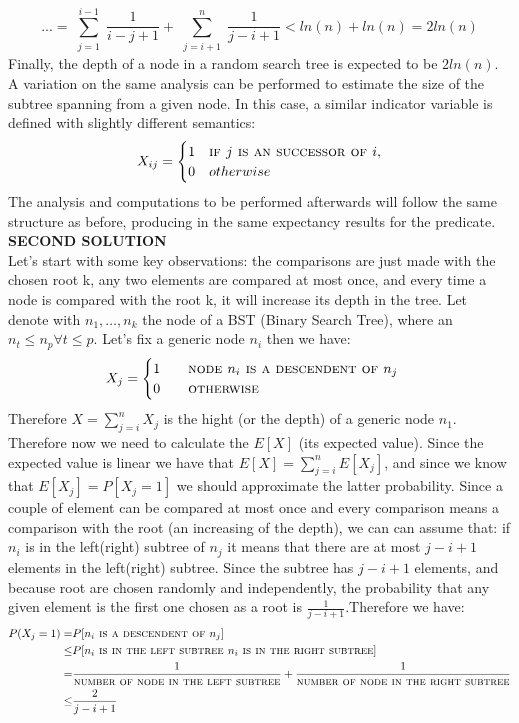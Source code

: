 \documentclass[a4paper]{article}
\begin{document}
\[... = \sum\limits_{\substack{j = 1}}^{i - 1} \frac{1}{i - j + 1} +
\sum\limits_{\substack{j = i + 1}}^{n} \frac{1}{j - i + 1} <
ln(n) + ln(n) = 2 ln(n)
\]
Finally, the depth of a node in a random search tree is expected to
be \(2 ln(n)\).
A variation on the same analysis can be performed to estimate the size
of the subtree spanning from a given node. In this case, a similar
indicator variable is defined with slightly different semantics:
\[X_{ij} = 
\begin{cases}
1 & \textsc{if } j \textsc{ is an successor of  } i,\cr
0 & otherwise
\end{cases}
\]
The analysis and computations to be performed afterwards will follow the
same structure as before, producing in the same expectancy results for
the predicate.
\\
\textbf{SECOND SOLUTION}
\\
Let's start with some key observations: the comparisons are just made with the chosen root k, any two elements are compared at most once, and every time a node is compared with the root k, it will increase its depth in the tree. Let denote with $n_1,\dots,n_k$ the node of a BST (Binary Search Tree), where an $n_t \leq n_p \forall t\leq p$. Let's fix a generic node $n_i$ then we have:
\begin{equation}
X_{j} =  
\begin{cases} 
1 \qquad \textsc{node } n_i \textsc{ is a descendent of } n_j\\
0 \qquad \textsc{otherwise}
\end{cases}
\nonumber
\end{equation}
Therefore $X=\sum_{j=i}^n X_{j}$ is the hight (or the depth) of a generic node $n_1$. Therefore now we need to calculate the $E[ X ]$ (its expected value). Since the expected value is linear we have that $E[X]= \sum_{j=i}^n E[X_{j}]$, and since we know that $E[X_j]=P[X_j=1]$ we should approximate the latter probability. Since a couple of element can be compared at most once and every comparison means a comparison with the root (an increasing of the depth), we can can assume that: if $n_i$ is in the left(right) subtree of $n_j$ it means that there are at most $j-i+1$ elements in the left(right) subtree. Since the subtree has $j-i+1$ elements, and because root are chosen randomly and independently, the probability that any given element is the first one chosen as a root is $\frac{1}{j-i+1}$.Therefore we have:
\begin{align*}
P(X_j=1)=&P[n_i\textsc{ is a descendent of } n_j] \\
		\leq& P[n_i \textsc{ is in the left subtree } n_i \textsc{ is in the right subtree}]\\
		=& \frac{1}{\textsc{number of node in the left subtree}} + \frac{1}{\textsc{number of node in the right subtree}}\\
		\leq& \frac{2}{j-i+1}
\end{align*} 
\end{document}
